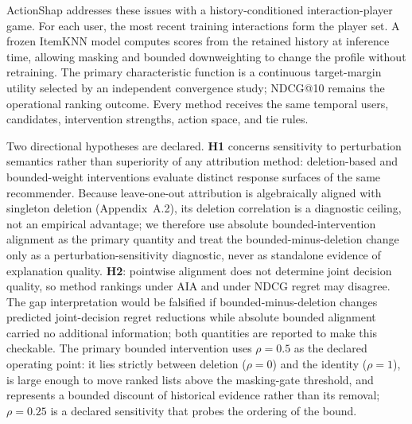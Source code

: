 \documentclass[a4paper,fleqn,doubleblind]{cas-sc}
\begin{document}
ActionShap addresses these issues with a history-conditioned interaction-player game. For each user, the most recent training interactions form the player set. A frozen ItemKNN model computes scores from the retained history at inference time, allowing masking and bounded downweighting to change the profile without retraining. The primary characteristic function is a continuous target-margin utility selected by an independent convergence study; NDCG@10 remains the operational ranking outcome. Every method receives the same temporal users, candidates, intervention strengths, action space, and tie rules.

Two directional hypotheses are declared. \textbf{H1} concerns sensitivity to perturbation semantics rather than superiority of any attribution method: deletion-based and bounded-weight interventions evaluate distinct response surfaces of the same recommender. Because leave-one-out attribution is algebraically aligned with singleton deletion (Appendix~A.2), its deletion correlation is a diagnostic ceiling, not an empirical advantage; we therefore use absolute bounded-intervention alignment as the primary quantity and treat the bounded-minus-deletion change only as a perturbation-sensitivity diagnostic, never as standalone evidence of explanation quality. \textbf{H2}: pointwise alignment does not determine joint decision quality, so method rankings under AIA and under NDCG regret may disagree. The gap interpretation would be falsified if bounded-minus-deletion changes predicted joint-decision regret reductions while absolute bounded alignment carried no additional information; both quantities are reported to make this checkable. The primary bounded intervention uses $\rho=0.5$ as the declared operating point: it lies strictly between deletion ($\rho=0$) and the identity ($\rho=1$), is large enough to move ranked lists above the masking-gate threshold, and represents a bounded discount of historical evidence rather than its removal; $\rho=0.25$ is a declared sensitivity that probes the ordering of the bound.
\end{document}
